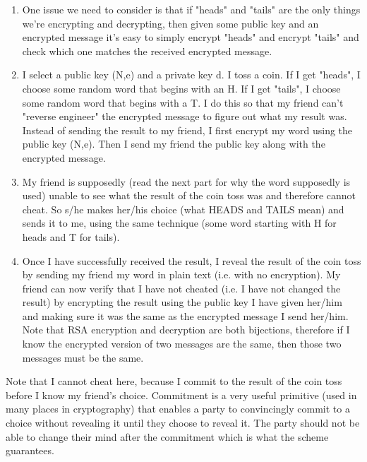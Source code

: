 \begin{solution}
\begin{enumerate}
\item One issue we need to consider is that if "heads" and "tails" are
the only things we're encrypting and decrypting, then given some public key
and an encrypted message it's easy to simply encrypt "heads" and encrypt
"tails" and check which one matches the received encrypted message.
\item  I select a public key (N,e) and a private key d. I toss a 
coin. If I get "heads", I choose some random word that begins with an H.
If I get "tails", I choose some random word that begins with a T. I do this
so that my friend can't "reverse engineer" the encrypted message to figure out
what my result was.
Instead of sending the result to my friend, I first encrypt my word
using the public key (N,e). Then I send my friend the public key 
along with the encrypted message. 
\item My friend is supposedly (read the next part for why the word 
supposedly is used) unable to see what the result of the coin toss was 
and therefore cannot cheat. So s/he makes her/his choice (what HEADS 
and TAILS mean) and sends it to me, using the same technique (some word
starting with H for heads and T for tails).
\item Once I have successfully received the result, I reveal the 
result of the coin toss by sending my friend my word in plain text 
(i.e. with no encryption). My friend can now verify that I have not 
cheated (i.e. I have not changed the result) by encrypting the result 
using the public key I have given her/him and making sure it was the 
same as the encrypted message I send her/him. Note that RSA encryption 
and decryption are both bijections, therefore if I know the encrypted 
version of two messages are the same, then those two messages must be 
the same. 
\end{enumerate}					
Note that I cannot cheat here, because I commit to the result of the 
coin toss before I know my friend’s choice. Commitment is a very useful 
primitive (used in many places in cryptography) that enables a party 
to convincingly commit to a choice without revealing it until they 
choose to reveal it. The party should not be able to change their 
mind after the commitment which is what the scheme guarantees. 
\end{solution}

\clearpage